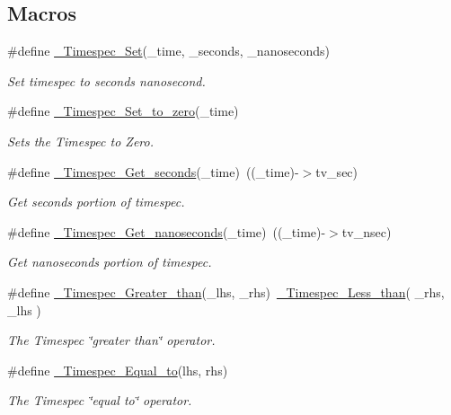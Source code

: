 \subsection*{Macros}
\begin{DoxyCompactItemize}
\item 
\#define \mbox{\hyperlink{group__Timespec_ga98b5ee3f544d2ab6732b054176ab6655}{\+\_\+\+Timespec\+\_\+\+Set}}(\+\_\+time,  \+\_\+seconds,  \+\_\+nanoseconds)
\begin{DoxyCompactList}\small\item\em Set timespec to seconds nanosecond. \end{DoxyCompactList}\item 
\#define \mbox{\hyperlink{group__Timespec_gaed72194da101184e87a9ee9625fdaf17}{\+\_\+\+Timespec\+\_\+\+Set\+\_\+to\+\_\+zero}}(\+\_\+time)
\begin{DoxyCompactList}\small\item\em Sets the Timespec to Zero. \end{DoxyCompactList}\item 
\#define \mbox{\hyperlink{group__Timespec_gae6f0f2e487b0a752ff7df43677c196d4}{\+\_\+\+Timespec\+\_\+\+Get\+\_\+seconds}}(\+\_\+time)~((\+\_\+time)-\/$>$tv\+\_\+sec)
\begin{DoxyCompactList}\small\item\em Get seconds portion of timespec. \end{DoxyCompactList}\item 
\#define \mbox{\hyperlink{group__Timespec_ga49fb63470ab8061cff099adc8c59410c}{\+\_\+\+Timespec\+\_\+\+Get\+\_\+nanoseconds}}(\+\_\+time)~((\+\_\+time)-\/$>$tv\+\_\+nsec)
\begin{DoxyCompactList}\small\item\em Get nanoseconds portion of timespec. \end{DoxyCompactList}\item 
\#define \mbox{\hyperlink{group__Timespec_ga7018e5a82aa23041b924c6320dade507}{\+\_\+\+Timespec\+\_\+\+Greater\+\_\+than}}(\+\_\+lhs,  \+\_\+rhs)~\mbox{\hyperlink{group__Timespec_ga16c13224570044fc45d39c342bf3aaa3}{\+\_\+\+Timespec\+\_\+\+Less\+\_\+than}}( \+\_\+rhs, \+\_\+lhs )
\begin{DoxyCompactList}\small\item\em The Timespec \char`\"{}greater than\char`\"{} operator. \end{DoxyCompactList}\item 
\#define \mbox{\hyperlink{group__Timespec_gac166c49ce5d03894939298956202bbb1}{\+\_\+\+Timespec\+\_\+\+Equal\+\_\+to}}(lhs,  rhs)
\begin{DoxyCompactList}\small\item\em The Timespec \char`\"{}equal to\char`\"{} operator. \end{DoxyCompactList}\end{DoxyCompactItemize}
